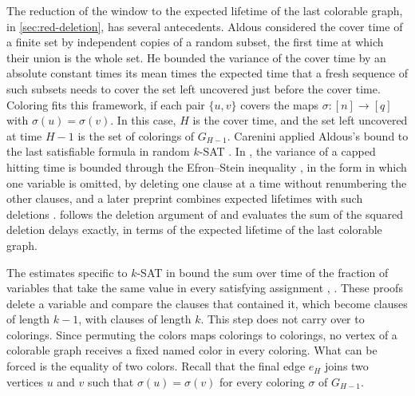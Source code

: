 The reduction of the window to the expected lifetime of the last colorable graph, in \cref{sec:red-deletion}, has several antecedents. Aldous \cite[Theorem~1(b)]{aldous1991threshold} considered the cover time of a finite set by independent copies of a random subset, the first time at which their union is the whole set. He bounded the variance of the cover time by an absolute constant times its mean times the expected time that a fresh sequence of such subsets needs to cover the set left uncovered just before the cover time. Coloring fits this framework, if each pair $\{u, v\}$ covers the maps $\sigma \colon [n] \to [q]$ with $\sigma(u) = \sigma(v)$. In this case, $H$ is the cover time, and the set left uncovered at time $H - 1$ is the set of colorings of $G_{H - 1}$. Carenini applied Aldous's bound to the last satisfiable formula in random $k$-SAT \cite[Theorem~4.1]{carenini2026polynomial}. In \cite[Lemmas~3.1 and~3.2]{openai2026limiting}, the variance of a capped hitting time is bounded through the Efron--Stein inequality \cite{efron1981jackknife,steele1986efron}, in the form \cite[(3.6)]{boucheron2005moment} in which one variable is omitted, by deleting one clause at a time without renumbering the other clauses, and a later preprint combines expected lifetimes with such deletions \cite[Section~3.3, Lemma~3.4]{openai2026variance}.  follows the deletion argument of \cite{openai2026limiting} and evaluates the sum of the squared deletion delays exactly, in terms of the expected lifetime of the last colorable graph.

The estimates specific to $k$-SAT in \cite{carenini2026polynomial,openai2026limiting} bound the sum over time of the fraction of variables that take the same value in every satisfying assignment \cite[Proposition~3.2]{carenini2026polynomial}, \cite[Proposition~2.2]{openai2026limiting}. These proofs delete a variable and compare the clauses that contained it, which become clauses of length $k - 1$, with clauses of length $k$. This step does not carry over to colorings. Since permuting the colors maps colorings to colorings, no vertex of a colorable graph receives a fixed named color in every coloring. What can be forced is the equality of two colors. Recall that the final edge $e_H$ joins two vertices $u$ and $v$ such that $\sigma(u) = \sigma(v)$ for every coloring $\sigma$ of $G_{H - 1}$.

